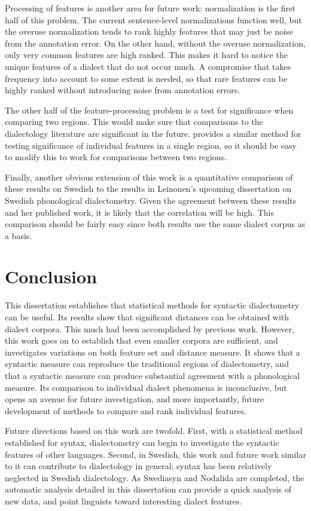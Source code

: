 Processing of features is another area for future work: normalization
is the first half of this problem. The current sentence-level
normalizations function well, but the overuse normalization tends to
rank highly features that may just be noise from the annotation
error. On the other hand, without the overuse normalization, only very
common features are high ranked. This makes it hard to notice the
unique features of a dialect that do not occur much. A compromise that
takes frequency into account to some extent is needed, so that rare
features can be highly ranked without introducing noise from
annotation errors.

The other half of the feature-processing problem is a test for
significance when comparing two regions. This would make sure that
comparisons to the dialectology literature are significant in the
future.  provides a similar method for testing
significance of individual features in a single region, so it should
be easy to modify this to work for comparisons between two regions.

Finally, another obvious extension of this work is a quantitative
comparison of these results on Swedish to the results in Leinonen's
upcoming dissertation on Swedish phonological dialectometry. Given the
agreement between these results and her published work, it is likely
that the correlation will be high. This comparison should be fairly
easy since both results use the same dialect corpus as a basis.

\section{Conclusion}

This dissertation establishes that statistical methods for syntactic
dialectometry can be useful. Its results show that significant
distances can be obtained with dialect corpora. This much had been
accomplished by previous work. However, this work goes on to establish
that even smaller corpora are sufficient, and investigates variations
on both feature set and distance measure. It shows that a syntactic
measure can reproduce the traditional regions of dialectometry, and
that a syntactic measure can produce substantial agreement with a
phonological measure. Its comparison to individual dialect phenomena is
inconclusive, but opens an avenue for future investigation, and more
importantly, future development of methods to compare and rank
individual features.

Future directions based on this work are twofold. First, with a
statistical method established for syntax, dialectometry can begin to
investigate the syntactic features of other languages. Second, in
Swedish, this work and future work similar to it can contribute to
dialectology in general; syntax has been relatively neglected in
Swedish dialectology. As Swediasyn and Nodalida are completed, the
automatic analysis detailed in this dissertation can provide a quick
analysis of new data, and point linguists toward interesting dialect
features.

